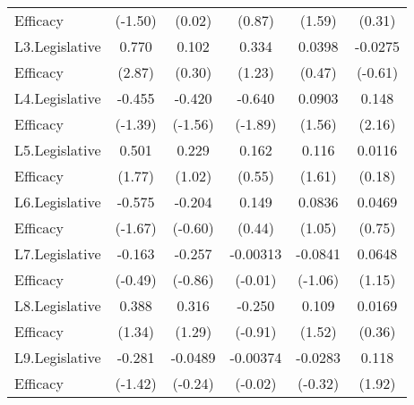 {\begin{tabular}{l*{5}{c}}
Efficacy            &     (-1.50)         &      (0.02)         &      (0.87)         &      (1.59)         &      (0.31)         \\
[1em]
L3.Legislative      &       0.770\sym{**} &       0.102         &       0.334         &      0.0398         &     -0.0275         \\
Efficacy            &      (2.87)         &      (0.30)         &      (1.23)         &      (0.47)         &     (-0.61)         \\
[1em]
L4.Legislative      &      -0.455         &      -0.420         &      -0.640         &      0.0903         &       0.148\sym{*}  \\
Efficacy            &     (-1.39)         &     (-1.56)         &     (-1.89)         &      (1.56)         &      (2.16)         \\
[1em]
L5.Legislative      &       0.501         &       0.229         &       0.162         &       0.116         &      0.0116         \\
Efficacy            &      (1.77)         &      (1.02)         &      (0.55)         &      (1.61)         &      (0.18)         \\
[1em]
L6.Legislative      &      -0.575         &      -0.204         &       0.149         &      0.0836         &      0.0469         \\
Efficacy            &     (-1.67)         &     (-0.60)         &      (0.44)         &      (1.05)         &      (0.75)         \\
[1em]
L7.Legislative      &      -0.163         &      -0.257         &    -0.00313         &     -0.0841         &      0.0648         \\
Efficacy            &     (-0.49)         &     (-0.86)         &     (-0.01)         &     (-1.06)         &      (1.15)         \\
[1em]
L8.Legislative      &       0.388         &       0.316         &      -0.250         &       0.109         &      0.0169         \\
Efficacy            &      (1.34)         &      (1.29)         &     (-0.91)         &      (1.52)         &      (0.36)         \\
[1em]
L9.Legislative      &      -0.281         &     -0.0489         &    -0.00374         &     -0.0283         &       0.118         \\
Efficacy            &     (-1.42)         &     (-0.24)         &     (-0.02)         &     (-0.32)         &      (1.92)         \\

\end{tabular}}
